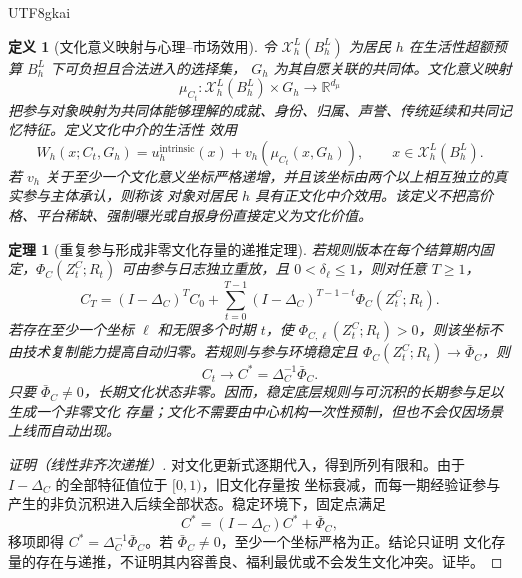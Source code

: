 \documentclass[12pt,a4paper,openany]{report}
\newtheorem{definition}{定义}[chapter]
\newtheorem{theorem}{定理}[chapter]
\newcommand{\RR}{\mathbb R}
\begin{document}
\begin{CJK*}{UTF8}{gkai}
\begin{definition}[文化意义映射与心理--市场效用]
令 \(\mathcal X_h^L(B_h^L)\) 为居民 \(h\) 在生活性超额预算 \(B_h^L\) 下可负担且合法进入的选择集，
\(G_h\) 为其自愿关联的共同体。文化意义映射
\[
  \mu_{C_t}:
  \mathcal X_h^L(B_h^L)\times G_h
  \longrightarrow\RR^{d_\mu}
\]
把参与对象映射为共同体能够理解的成就、身份、归属、声誉、传统延续和共同记忆特征。定义文化中介的生活性
效用
\[
  W_h(x;C_t,G_h)
  =
  u_h^{\mathrm{intrinsic}}(x)
  +v_h\!\left(\mu_{C_t}(x,G_h)\right),
  \qquad x\in\mathcal X_h^L(B_h^L).
\]
若 \(v_h\) 关于至少一个文化意义坐标严格递增，并且该坐标由两个以上相互独立的真实参与主体承认，则称该
对象对居民 \(h\) 具有正文化中介效用。该定义不把高价格、平台稀缺、强制曝光或自报身份直接定义为文化价值。
\end{definition}

\begin{theorem}[重复参与形成非零文化存量的递推定理]
\label{thm:cultural-stock-accumulation}
若规则版本在每个结算期内固定，\(\Phi_C(Z_t^C;R_t)\) 可由参与日志独立重放，且
\(0<\delta_\ell\le1\)，则对任意 \(T\ge1\)，
\[
  C_T
  =
  (I-\Delta_C)^TC_0
  +
  \sum_{t=0}^{T-1}
  (I-\Delta_C)^{T-1-t}
  \Phi_C(Z_t^C;R_t).
\]
若存在至少一个坐标 \(\ell\) 和无限多个时期 \(t\)，使
\(\Phi_{C,\ell}(Z_t^C;R_t)>0\)，则该坐标不由技术复制能力提高自动归零。若规则与参与环境稳定且
\(\Phi_C(Z_t^C;R_t)\to\bar\Phi_C\)，则
\[
  C_t\longrightarrow C^*=\Delta_C^{-1}\bar\Phi_C.
\]
只要 \(\bar\Phi_C\ne0\)，长期文化状态非零。因而，稳定底层规则与可沉积的长期参与足以生成一个非零文化
存量；文化不需要由中心机构一次性预制，但也不会仅因场景上线而自动出现。
\end{theorem}

\begin{proof}[证明（线性非齐次递推）]
对文化更新式逐期代入，得到所列有限和。由于 \(I-\Delta_C\) 的全部特征值位于 \([0,1)\)，旧文化存量按
坐标衰减，而每一期经验证参与产生的非负沉积进入后续全部状态。稳定环境下，固定点满足
\[
  C^*=(I-\Delta_C)C^*+\bar\Phi_C,
\]
移项即得 \(C^*=\Delta_C^{-1}\bar\Phi_C\)。若 \(\bar\Phi_C\ne0\)，至少一个坐标严格为正。结论只证明
文化存量的存在与递推，不证明其内容善良、福利最优或不会发生文化冲突。证毕。
\end{proof}


\end{CJK*}
\end{document}
